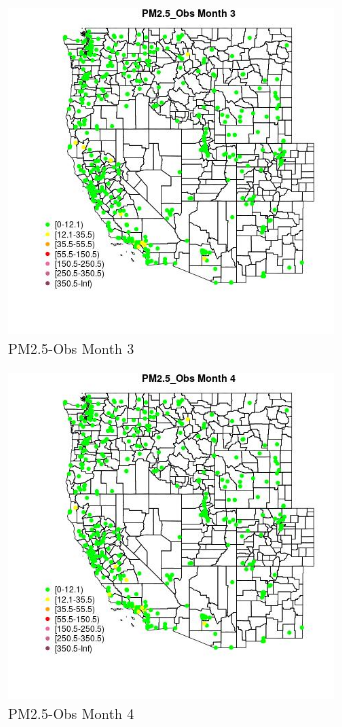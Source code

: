 \begin{figure} 
\centering  
\includegraphics[width=0.77\textwidth]{Code_Outputs/ML_input_report_ML_input_PM25_Step5_part_d_de_duplicated_aves_ML_input_MapObsMo3PM25_Obs.jpg} 
\caption{\label{fig:ML_input_report_ML_input_PM25_Step5_part_d_de_duplicated_aves_ML_inputMapObsMo3PM25_Obs}PM2.5-Obs Month 3} 
\end{figure} 
 

\begin{figure} 
\centering  
\includegraphics[width=0.77\textwidth]{Code_Outputs/ML_input_report_ML_input_PM25_Step5_part_d_de_duplicated_aves_ML_input_MapObsMo4PM25_Obs.jpg} 
\caption{\label{fig:ML_input_report_ML_input_PM25_Step5_part_d_de_duplicated_aves_ML_inputMapObsMo4PM25_Obs}PM2.5-Obs Month 4} 
\end{figure} 
 

